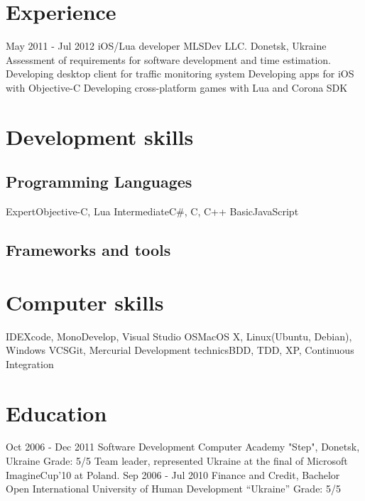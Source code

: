 \documentclass[11pt,a4paper]{moderncv}
\begin{document}
\section{Experience}
\cventry
  {May 2011 - Jul 2012}
  {iOS/Lua developer}
  {MLSDev LLC. Donetsk, Ukraine}
  {}{}
  {Assessment of requirements for software development and time estimation. 
  \newline  Developing desktop client for traffic monitoring system
  \newline{}Developing apps for iOS with Objective-C
  \newline{}Developing cross-platform games with Lua and Corona SDK}

\section{Development skills}
\subsection{Programming Languages}
\cvline
  {Expert}{Objective-C, Lua}
\cvline
  {Intermediate}{C\#, C, C++}
\cvline
  {Basic}{JavaScript}
\subsection{Frameworks and tools}

\section{Computer skills}
  \cvline
  {IDE}{Xcode, MonoDevelop, Visual Studio}
  \cvline
  {OS}{MacOS X, Linux(Ubuntu, Debian), Windows}
  \cvline
  {VCS}{Git, Mercurial}
  \cvline
  {Development technics}{BDD, TDD, XP, Continuous Integration}

\section{Education}
  \cventry
    {Oct 2006 - Dec 2011}
    {Software Development}
    {Computer Academy "Step", Donetsk, Ukraine}
    {Grade: 5/5}{}
    {Team leader, represented Ukraine at the final of Microsoft ImagineCup'10 at Poland.}
  \cventry
    {Sep 2006 - Jul 2010}
    {Finance and Credit, Bachelor}
    {\newline Open International University of Human Development “Ukraine”}
    {Grade: 5/5}{}{}
    
\end{document}
